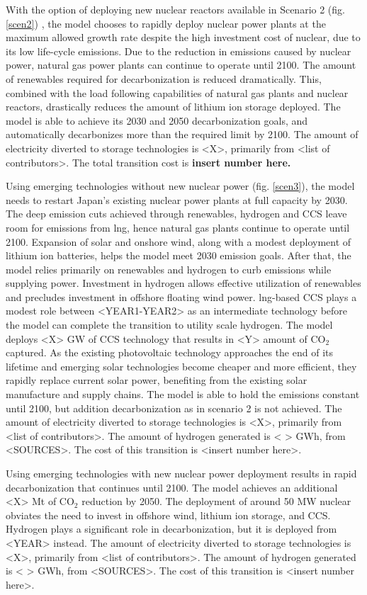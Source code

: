 With the option of deploying new nuclear reactors available in Scenario 2 (fig. \ref{scen2}) , the model chooses to rapidly deploy nuclear power plants at the maximum allowed growth rate despite the high investment cost of nuclear, due to its low life-cycle emissions. Due to the reduction in emissions caused by nuclear power, natural gas power plants can continue to operate until 2100. The amount of renewables required for decarbonization is reduced dramatically. This, combined with the load following capabilities of natural gas plants and nuclear reactors, drastically reduces the amount of lithium ion storage deployed. The model is able to achieve its 2030 and 2050 decarbonization goals, and automatically decarbonizes more than the required limit by 2100. The amount of electricity diverted to storage technologies is <X>, primarily from <list of contributors>. The total transition cost is \textbf{insert number here.}

Using emerging technologies without new nuclear power (fig. \ref{scen3}), the model needs to restart Japan's existing nuclear power plants at full capacity by 2030. The deep emission cuts achieved through renewables, hydrogen and \gls{CCS} leave room for emissions from \gls{lng}, hence natural gas plants continue to operate until 2100. Expansion of solar and onshore wind, along with a modest deployment of lithium ion batteries, helps the model meet 2030 emission goals. After that, the model relies primarily on renewables and hydrogen to curb emissions while supplying power. Investment in hydrogen allows effective utilization of renewables and precludes investment in offshore floating wind power. \gls{lng}-based \gls{CCS} plays a modest role between <YEAR1-YEAR2> as an intermediate technology before the model can complete the transition to utility scale hydrogen. The model deploys <X> GW of \gls{CCS} technology that results in <Y> amount of CO$_2$ captured. As the existing photovoltaic technology approaches the end of its lifetime and emerging solar technologies become cheaper and more efficient, they rapidly replace current solar power, benefiting from the existing solar manufacture and supply chains. The model is able to hold the emissions constant until 2100, but addition decarbonization as in scenario 2 is not achieved. The amount of electricity diverted to storage technologies is <X>, primarily from <list of contributors>. The amount of hydrogen generated is < > GWh, from <SOURCES>. The cost of this transition is <insert number here>.

Using emerging technologies with new nuclear power deployment results in rapid decarbonization that continues until 2100. The model achieves an additional <X> Mt of CO$_2$ reduction by 2050. The deployment of around 50 MW nuclear obviates the need to invest in offshore wind, lithium ion storage, and \gls{CCS}. Hydrogen plays a significant role in decarbonization, but it is deployed from <YEAR> instead. The amount of electricity diverted to storage technologies is <X>, primarily from <list of contributors>. The amount of hydrogen generated is < > GWh, from <SOURCES>. The cost of this transition is <insert number here>.

